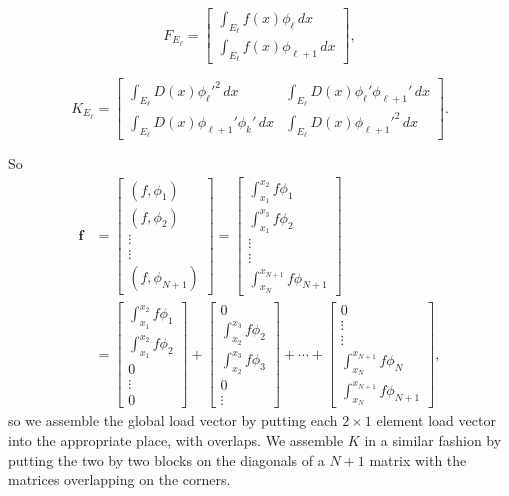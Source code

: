 \documentclass[12pt, a4paper]{article}
\renewcommand{\vec}[1]{\mathbf{#1}}
\theoremstyle{definition}
\theoremstyle{remark}
\numberwithin{equation}{section}
\begin{document}
\begin{equation*}
F_{E_{\ell}} =
\begin{bmatrix}
\int_{E_{\ell}}f(x)\phi_{\ell} \, dx\\
\int_{E_{\ell}}f(x)\phi_{{\ell}+1} \, dx
\end{bmatrix},
\end{equation*}

\begin{equation*}
K_{E_{\ell}} =
\begin{bmatrix}
\int_{E_{\ell}}D(x)\phi_{\ell}'^2 \, dx & \int_{E_{\ell}}D(x)\phi_{\ell}'\phi_{{\ell}+1}' \, dx \\
\int_{E_{\ell}}D(x)\phi_{{\ell}+1}'\phi_k' \, dx & \int_{E_{\ell}}D(x)\phi_{{\ell}+1}'^2 \, dx
\end{bmatrix}.
\end{equation*}

So 
\begin{align*}
\vec{f} &= 
\begin{bmatrix}
( f, \phi_1 )\\
( f, \phi_2 )\\
\vdots\\
\vdots\\
( f, \phi_{N+1} )
\end{bmatrix}
=
\begin{bmatrix}
\int_{x_1}^{x_2} f\phi_1\\
\int_{x_1}^{x_3} f\phi_2\\
\vdots\\
\vdots\\
\int_{x_{N}}^{x_{N+1}} f\phi_{N+1}
\end{bmatrix}
\\
&=
\begin{bmatrix}
\int_{x_1}^{x_2} f\phi_1\\
\int_{x_1}^{x_2} f\phi_2\\
0\\
\vdots\\
0
\end{bmatrix}
+
\begin{bmatrix}
0\\
\int_{x_2}^{x_3} f\phi_2 \\
\int_{x_2}^{x_3} f\phi_3 \\
0\\
\vdots
\end{bmatrix}
+ 
\cdots
+
\begin{bmatrix}
0\\
\vdots\\
\vdots\\
\int_{x_N}^{x_{N+1}} f\phi_N\\
\int_{x_N}^{x_{N+1}} f\phi_{N+1}
\end{bmatrix},
\end{align*}
so we assemble the global load vector by putting each $2 \times 1$ element load vector into the appropriate place, with overlaps. 
We assemble $K$ in a similar fashion by putting the two by two blocks on the diagonals of a $N+1$ matrix with the matrices overlapping on the corners.
\end{document}
